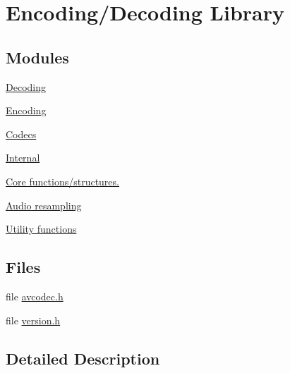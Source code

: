 \hypertarget{group__libavc}{}\section{Encoding/\+Decoding Library}
\label{group__libavc}
\subsection*{Modules}
\begin{DoxyCompactItemize}
\item 
\hyperlink{group__lavc__decoding}{Decoding}
\item 
\hyperlink{group__lavc__encoding}{Encoding}
\item 
\hyperlink{group__lavc__codec}{Codecs}
\item 
\hyperlink{group__lavc__internal}{Internal}
\item 
\hyperlink{group__lavc__core}{Core functions/structures.}
\item 
\hyperlink{group__lavc__resample}{Audio resampling}
\item 
\hyperlink{group__lavc__misc}{Utility functions}
\end{DoxyCompactItemize}
\subsection*{Files}
\begin{DoxyCompactItemize}
\item 
file \hyperlink{avcodec_8h}{avcodec.\+h}
\item 
file \hyperlink{ffmpeg_2libavcodec_2version_8h}{version.\+h}
\end{DoxyCompactItemize}


\subsection{Detailed Description}
